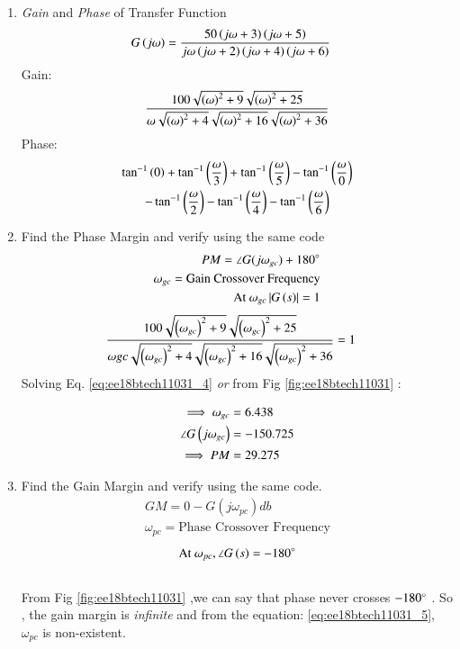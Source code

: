 \begin{enumerate}[label=\thesection.\arabic*.,ref=\thesection.\theenumi]
\item {\em Gain} and {\em Phase} of Transfer Function 
\begin{align}
G\left(j\omega\right) &= \frac{50\left(j\omega+3\right)\left(j\omega+5\right)}{j\omega\left(j\omega+2\right)\left(j\omega+4\right)\left(j\omega+6\right)}
\end{align}
Gain:
\begin{align}
    \frac{100\sqrt{{\brak{\omega}^2+9}}\sqrt{\brak{\omega}^2+25}}{\omega\sqrt{\brak{\omega}^2+4}\sqrt{\brak{\omega}^2+16}\sqrt{\brak{\omega}^2+36}}
\label{eq:ee18btech11031_2}
\end{align}{}
Phase:
\begin{multline}
\tan^{-1} \brak{0}+\tan^{-1} \brak{\frac{\omega}{3}}+\tan^{-1} \brak{\frac{\omega}{5}}-\tan^{-1} \brak{\frac{\omega}{0}}\\-\tan^{-1} \brak{\frac{\omega}{2}} - \tan^{-1} \brak{\frac{\omega}{4}}-\tan^{-1} \brak{\frac{\omega}{6}} 
\label{eq:ee18btech11031_3}
\end{multline}
\item Find the Phase Margin and verify using the same code
\begin{align}
 PM = \angle G(j\omega_{gc}) + 180\degree \\
\omega_{gc}=\text{Gain Crossover Frequency}\\
\text{At }  \omega_{gc} \left| G\left(s\right)\right|  = 1
\end{align}
\solution
\begin{align}
    \frac{100\sqrt{{\brak{\omega_{gc}}^2+9}}\sqrt{\brak{\omega_{gc}}^2+25}}{\omega{gc}\sqrt{\brak{\omega_{gc}}^2+4}\sqrt{\brak{\omega_{gc}}^2+16}\sqrt{\brak{\omega_{gc}}^2+36}} &= 1
\label{eq:ee18btech11031_4}
\end{align}
Solving Eq. \eqref{eq:ee18btech11031_4} {\em or} from Fig \ref{fig:ee18btech11031} :

\begin{align}
\implies
\omega_{gc} &= 6.438  \\
\angle G\left(j\omega_{gc}\right) &= -150.725 \\
\implies
PM &= 29.275 
\end{align}

\item Find the Gain Margin  and verify using the same code.
\begin{align}
 GM = 0 -G(j\omega_{pc}) db \\
\omega_{pc}=\text{Phase Crossover Frequency}
\end{align}
\begin{align}
\text{At }  \omega_{pc}, \angle G\brak{s}  = -180\degree
\label{eq:ee18btech11031_5}
\end{align}
 \\
\solution
From Fig \ref{fig:ee18btech11031} ,we can say that phase  never crosses $-180\degree$ .
So , the gain margin is {\em infinite} and from the equation: \ref{eq:ee18btech11031_5}, $\omega_{pc}$ is non-existent.




\end{enumerate}
